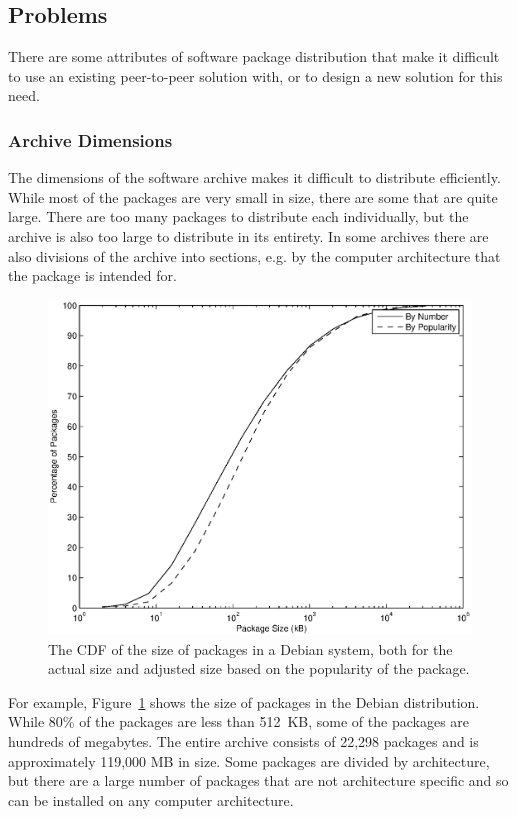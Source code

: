 \documentclass[conference]{IEEEtran}
\begin{document}
\subsection{Problems}
\label{problems}

There are some attributes of software package distribution that make
it difficult to use an existing peer-to-peer solution with, or to
design a new solution for this need.

\subsubsection{Archive Dimensions}

The dimensions of the software archive makes it difficult to
distribute efficiently. While most of the packages are very small in
size, there are some that are quite large. There are too many
packages to distribute each individually, but the archive is also
too large to distribute in its entirety. In some archives there are
also divisions of the archive into sections, e.g. by the computer
architecture that the package is intended for. 

\begin{figure}
\centering
\includegraphics[width=\columnwidth]{apt_p2p_simulation-size_CDF.eps}
\caption{The CDF of the size of packages in a Debian system, both
for the actual size and adjusted size based on the popularity of
the package.}
\label{size_CDF}
\end{figure}

For example, Figure~\ref{size_CDF} shows the size of packages in the
Debian distribution. While 80\% of the packages are less than
512~KB, some of the packages are hundreds of megabytes. The entire
archive consists of 22,298 packages and is approximately 119,000 MB
in size. Some packages are divided by architecture, but there are a
large number of packages that are not architecture specific and so
can be installed on any computer architecture.
\end{document}
